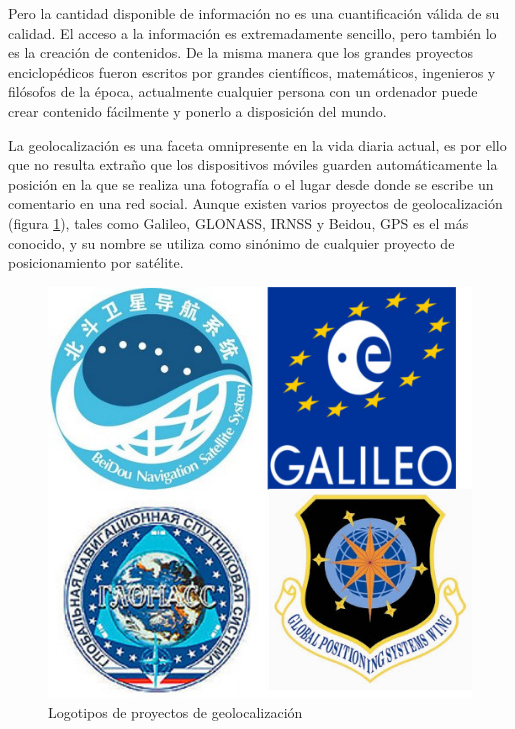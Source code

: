 Pero la cantidad disponible de información no es una cuantificación válida de su calidad. El acceso a la información es extremadamente sencillo, pero también lo es la creación de contenidos. De la misma manera que los grandes proyectos enciclopédicos fueron escritos por grandes científicos, matemáticos, ingenieros y filósofos de la época, actualmente cualquier persona con un ordenador puede crear contenido fácilmente y ponerlo a disposición del mundo.

% 


La geolocalización es una faceta omnipresente en la vida diaria actual, es por ello que no resulta extraño que los dispositivos móviles guarden automáticamente la posición en la que se realiza una fotografía o el lugar desde donde se escribe un comentario en una red social. Aunque existen varios proyectos de geolocalización (figura \ref{Logos_satelites}), tales como Galileo, \ac{GLONASS}, \ac{IRNSS} y Beidou, \ac{GPS} es el más conocido, y su nombre se utiliza como sinónimo de cualquier proyecto de posicionamiento por satélite.

\begin{figure}[hbtp]
\centering
\includegraphics[scale=0.75, fbox={\fboxrule} 4mm]{images/introduccion/Sistemas_posicionamiento_satelites.jpg}
\caption{Logotipos de proyectos de geolocalización}
\label{Logos_satelites}
\end{figure}


